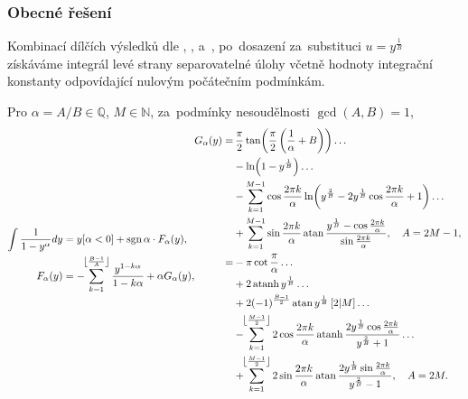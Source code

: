 \subsubsection{Obecné řešení}\label{sss:obecne_reseni}
Kombinací dílčích výsledků dle , ,  a~, po~dosazení za~substituci $u=y^{\frac{1}{B}}$ získáváme integrál levé strany separovatelné úlohy  včetně hodnoty integrační konstanty odpovídající nulovým počátečním podmínkám. 

Pro $\alpha=A/B\in\mathbb{Q}$, $M\in\mathbb{N}$, za~podmínky nesoudělnosti $\gcd(A,B)=1$,
\begin{subequations}\label{eq:solution_general_whole}
\begin{align}
    \int\frac{1}{1-y^{\alpha}}d{y}
    &=y[\alpha<0]+\sgn{\alpha}\cdot F_{\alpha}(y),\\
    F_{\alpha}(y)
    &=-\!\!\sum_{k=1}^{\floor{\frac{B-1}{A}}}\frac{y^{1-k\alpha}}{1-k\alpha}+\alpha G_{\alpha}(y),
\end{align}
\begin{align}
    G_\alpha(y)
    =&\,\frac{\pi}{2}\tan\!\left(\frac{\pi}{2}\left(\frac{1}{\alpha}+B\right)\right)\dots\\
    &-\ln\!\left(1-y^{\frac{1}{B}}\right)\dots\\
    &-\sum_{k=1}^{M-1}\cos\frac{2\pi k}{\alpha}\ln\!\left(y^{\frac{2}{B}}-2y^{\frac{1}{B}}\cos\frac{2\pi k}{\alpha}+1\right)\dots\\
    &+\sum_{k=1}^{M-1}\sin\frac{2\pi k}{\alpha}\atan\frac{y^{\frac{1}{B}}-\cos\frac{2\pi k}{\alpha}}{\sin\frac{2\pi k}{\alpha}},\quad A=2M-1,\\
    =&-\pi\cot\frac{\pi}{\alpha}\dots\\
    &+2\atanh{y^{\frac{1}{B}}}\dots\\
    &+2(-1)^{\frac{B-1}{2}}\atan y^{\frac{1}{B}}\,[2|M]\dots\\
    &-\!\!\sum_{k=1}^{\floor{\frac{M-1}{2}}}2\cos\frac{2\pi k}{\alpha}\atanh\frac{2y^{\frac{1}{B}}\cos\frac{2\pi k}{\alpha}}{y^{\frac{2}{B}}+1}\dots\\
    &+\!\!\sum_{k=1}^{\floor{\frac{M-1}{2}}}2\sin\frac{2\pi k}{\alpha}\atan\frac{2y^{\frac{1}{B}}\sin\frac{2\pi k}{\alpha}}{y^{\frac{2}{B}}-1}, \quad A=2M.
\end{align}
\end{subequations}
